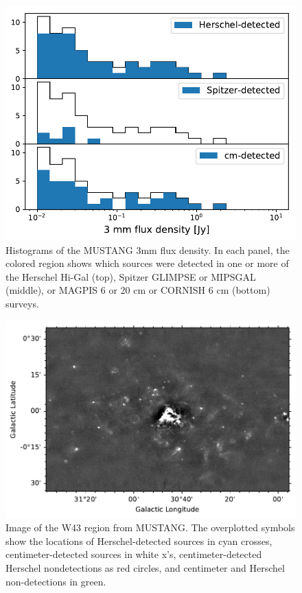 \documentclass[twocolumn]{aastex62}
\begin{document}
\begin{figure}[htp]
    \includegraphics[scale=1]{figures/G31_dend_contour_thr4_minn20_mind1_detection_histograms.pdf}
\caption{Histograms of the MUSTANG 3mm flux density.  In each panel, the colored region shows which
sources were detected in one or more of the Herschel Hi-Gal (top), Spitzer GLIMPSE or MIPSGAL (middle),
or MAGPIS 6 or 20 cm or CORNISH 6 cm (bottom) surveys.}
\label{fig:histogram}
\end{figure}

\begin{figure}[htp]
    \includegraphics[width=17cm]{figures/W43_catalog_overlay.pdf}
\caption{Image of the W43 region from MUSTANG.  The overplotted symbols show the locations
of Herschel-detected sources in cyan crosses, centimeter-detected sources in white x's, centimeter-detected Herschel nondetections as red circles,
and centimeter and Herschel non-detections in green.}
\label{fig:w43overview}
\end{figure}
\end{document}
